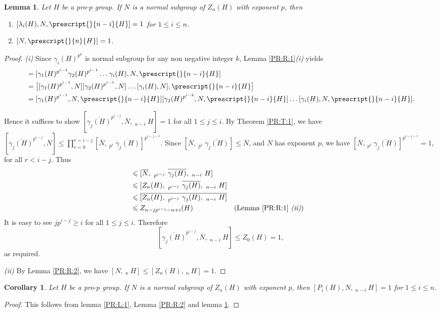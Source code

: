 \documentclass[12pt]{elsarticle}
\newtheorem{lemma}[theorem]{Lemma}
\newtheorem{corollary}[theorem]{Corollary}
\newtheorem*{main corollary*}{Main Corollary}
\theoremstyle{definition}
\begin{document}
 \begin{lemma}\label{MR:L:1}
Let $H$ be a pro-$p$ group. If $N$ is a normal subgroup of $Z_n(H)$ with exponent $p$, then 
\begin{enumerate}
    \item[(i)] $[\lambda_i(H), N,\prescript{}{n-i}{H}]=1$ for $1\leq i\leq n$.
    \item[(ii)] $[N,\prescript{}{n}{H}]=1$.
\end{enumerate}
 \end{lemma}
\begin{proof}\textit{(i)} Since $\gamma_i(H)^{p^k}$ is normal subgroup for any non negative integer $k$, Lemma \ref{PR:R:1}\textit{(i)} yields \begin{align*}
    [\lambda_i(H), N,\prescript{}{n-i}{H}]&= [\gamma_1(H)^{p^{i-1}}\gamma_2(H)^{p^{i-1}}\ldots \gamma_i(H), N,\prescript{}{n-i}{H}]\\
    &= \big[[\gamma_1(H)^{p^{i-1}},N][\gamma_2(H)^{p^{i-1}},N]\ldots [\gamma_i(H), N], \prescript{}{n-i}{H}\big]\\
    &=[\gamma_1(H)^{p^{i-1}},N,\prescript{}{n-i}{H}][\gamma_2(H)^{p^{i-2}},N,\prescript{}{n-i}{H}]\ldots [\gamma_i(H), N,\prescript{}{n-i}{H}].
\end{align*}

Hence it suffices to show $[\overline{\gamma_j(H)}^{p^{i-j}},\overline{N},\  _{n-i}\ H]=1$ for all $1\leq j\leq i$. By Theorem \ref{PR:T:1}, we have $[\overline{\gamma_j(H)}^{p^{i-j}},\overline{N}]\leqslant \prod\limits_{r=0}^{r=i-j}[\overline{N},\ _{p^{r}}\ \overline{\gamma_j(H)}]^{p^{i-j-r}}$. Since $[\overline{N},\ _{p^{r}}\ \overline{\gamma_j(H)}]\leqslant \overline{N}$, and $\overline{N}$ has exponent $p$, we have $[\overline{N},\ _{p^{r}}\ \overline{\gamma_j(H)}]^{p^{i-j-r}}=1$,  for all $r< i-j$. Thus\begin{align*}
    [\overline{\gamma_j(H)}^{p^{i-j}},\overline{N},\ _{n-i}\ H]&\leqslant [\overline{N},\ _{p^{i-j}}\ \overline{\gamma_j(H)},\ _{n-i}\ H]\\
    &\leqslant [Z_n(H),\ _{p^{i-j}}\ \overline{\gamma_j(H)},\ _{n-i}\ H]\\
    &\leqslant \overline{[Z_n(H),\ _{p^{i-j}}\ \gamma_j(H),\ _{n-i}\ H]}\\
    &\leqslant Z_{n-jp^{i-j}-n+i}(H) &&\mbox{(Lemma \ref{PR:R:1} \textit{(ii)})}
\end{align*} It is easy to see $jp^{i-j}\geq i$ for all $1\leq j\leq i$. Therefore  \[[\overline{\gamma_j(H)}^{p^{i-j}},\overline{N},\ _{n-i}\ H]\leqslant Z_0(H)=1,\] as required.
\par\textit{(ii)} By Lemma \ref{PR:R:2}, we have ${[N,\ _n\ H]\leqslant [Z_n(H),\ _n\  H]=1}$.
 \end{proof}
 \begin{corollary}
Let $H$ be a pro-$p$ group. If $N$ is a normal subgroup of $Z_n(H)$ with exponent $p$, then $[P_i(H), N,\ _{n-i}\ H]=1$ for $1\leq i\leq n$.
 \end{corollary}
 \begin{proof}
    This follows from lemma \ref{PR:L:1}, Lemma \ref{PR:R:2} and lemma \ref{MR:L:1}.
 \end{proof}
 
\end{document}
